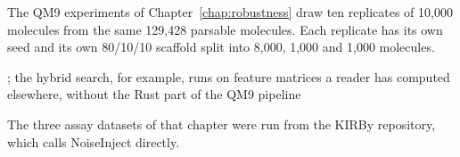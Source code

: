 The QM9 experiments of Chapter~\ref{chap:robustness} draw ten replicates of 10,000 molecules from the same 129,428 parsable molecules. Each replicate has its own seed and its own 80/10/10 scaffold split into 8,000, 1,000 and 1,000 molecules.

; the hybrid search, for example, runs on feature matrices a reader has computed elsewhere, without the Rust part of the QM9 pipeline

The three assay datasets of that chapter were run from the KIRBy repository, which calls NoiseInject directly.
